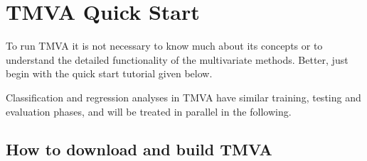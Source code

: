 \section{TMVA Quick Start}
\label{sec:quickstart}

To run TMVA it is not necessary to know much about its concepts or to understand 
the detailed functionality of the multivariate methods. Better, just begin 
with the quick start tutorial given below.

Classification and regression analyses in TMVA have similar training, testing and 
evaluation phases, and will be treated in parallel in the following. 

\subsection{How to download and build TMVA}
\label{sec:download}


